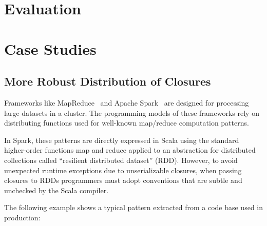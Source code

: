 \documentclass{llncs}
\begin{document}
\section{Evaluation}
\label{sec:evaluation}

%


\section{Case Studies}
\label{sec:case-studies}

\subsection{More Robust Distribution of Closures}

Frameworks like MapReduce~\cite{MapReduce} and Apache Spark~\cite{Spark} are designed for processing large datasets in a cluster. The programming models of these frameworks rely on distributing functions used for well-known map/reduce computation patterns.

In Spark, these patterns are directly expressed in Scala using the standard higher-order functions map and reduce applied to an abstraction for distributed collections called ``resilient distributed dataset'' (RDD). However, to avoid unexpected runtime exceptions due to unserializable closures, when passing closures to RDDs programmers must adopt conventions that are subtle and unchecked by the Scala compiler.

The following example shows a typical pattern extracted from a code base used in production:
\end{document}
